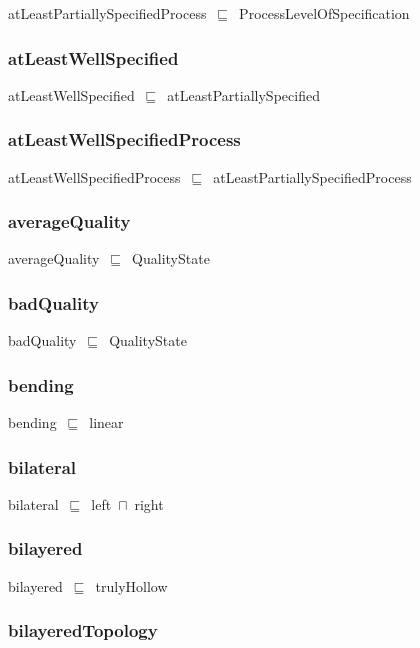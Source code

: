 \documentclass{article}
\begin{document}
atLeastPartiallySpecifiedProcess~\ensuremath{\sqsubseteq}~ProcessLevelOfSpecification~

\subsubsection*{atLeastWellSpecified}

atLeastWellSpecified~\ensuremath{\sqsubseteq}~atLeastPartiallySpecified~

\subsubsection*{atLeastWellSpecifiedProcess}

atLeastWellSpecifiedProcess~\ensuremath{\sqsubseteq}~atLeastPartiallySpecifiedProcess~

\subsubsection*{averageQuality}

averageQuality~\ensuremath{\sqsubseteq}~QualityState~

\subsubsection*{badQuality}

badQuality~\ensuremath{\sqsubseteq}~QualityState~

\subsubsection*{bending}

bending~\ensuremath{\sqsubseteq}~linear~

\subsubsection*{bilateral}

bilateral~\ensuremath{\sqsubseteq}~left~\ensuremath{\sqcap}~right~

\subsubsection*{bilayered}

bilayered~\ensuremath{\sqsubseteq}~trulyHollow~

\subsubsection*{bilayeredTopology}
\end{document}

